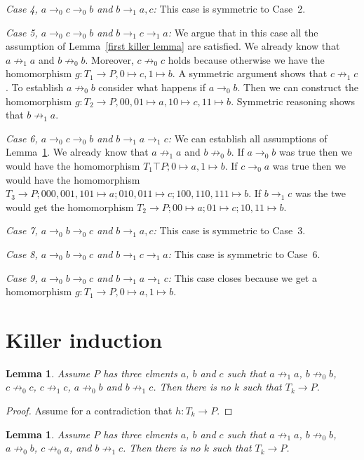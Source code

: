 \documentclass[a4paper]{article}
\newtheorem{lemma}[theorem]{Lemma}
\newcommand{\case}[2]{\vspace{1ex}\noindent\textit{Case #1, #2:}}
\begin{document}
\case{4}{$a \rightarrow_0 c \rightarrow_0 b$ and $b \rightarrow_1 a,c$}
This case is symmetric to Case~2.

\case{5}{$a \rightarrow_0 c \rightarrow_0 b$ and $b \rightarrow_1 c
\rightarrow_1 a$}
We argue that in this case all the assumption of Lemma~\ref{first killer
lemma} are satisfied. We already know that $a \not \rightarrow_1 a$ and
$b \not \rightarrow_0 b$. Moreover, $c \not \rightarrow_0 c$ holds
because otherwise we have the homomorphism $g : T_1 \to P, 0 \mapsto c,
1 \mapsto b$. A symmetric argument shows that $c \not \rightarrow_1 c$.
To establish $a \not \rightarrow_0 b$ consider what happens if $a
\rightarrow_0 b$. Then we can construct the homomorphism $g : T_2 \to P,
00, 01 \mapsto a, 10 \mapsto c, 11 \mapsto b$. Symmetric reasoning shows
that $b \not \rightarrow_1 a$.

\case{6}{$a \rightarrow_0 c \rightarrow_0 b$ and $b \rightarrow_1 a
\rightarrow_1 c$}
We can establish all assumptions of Lemma~\ref{second killer lemma}. We
already know that $a \not \rightarrow_1 a$ and $b \not \rightarrow_0 b$.
If $a \rightarrow_0 b$ was true then we would have the homomorphism $T_1
\top P; 0 \mapsto a, 1 \mapsto b$. If $c \rightarrow_0 a$ was true then
we would have the homomorphism $T_3 \to P; 000,001,101 \mapsto a;
010,011 \mapsto c; 100,110,111 \mapsto b$. If $b \rightarrow_1 c$ was
the twe would get the homomorphism $T_2 \to P; 00 \mapsto a; 01 \mapsto
c; 10,11 \mapsto b$.


\case{7}{$a \rightarrow_0 b \rightarrow_0 c$ and $b \rightarrow_1 a,c$}
This case is symmetric to Case~3.

\case{8}{$a \rightarrow_0 b \rightarrow_0 c$ and $b \rightarrow_1 c
\rightarrow_1 a$}
This case is symmetric to Case~6.

\case{9}{$a \rightarrow_0 b \rightarrow_0 c$ and $b \rightarrow_1 a
\rightarrow_1 c$} This case closes because we get a homomorphism $g :
T_1 \to P, 0 \mapsto a, 1 \mapsto b$.

\section{Killer induction}

\begin{lemma} \label{first killer lemma}
 Assume $P$ has three elments $a$, $b$ and $c$ such that $a \not
\rightarrow_1 a$, $b \not \rightarrow_0 b$, $c \not \rightarrow_0 c$,
$c \not \rightarrow_1 c$, $a \not \rightarrow_0 b$ and $b \not
\rightarrow_1 c$. Then there is no $k$ such that $T_k \to P$.
\end{lemma}
\begin{proof}
 Assume for a contradiction that $h : T_k \to P$.
\end{proof}

\begin{lemma} \label{second killer lemma}
 Assume $P$ has three elments $a$, $b$ and $c$ such that $a \not
\rightarrow_1 a$, $b \not \rightarrow_0 b$, $a \not \rightarrow_0 b$, $c
\not \rightarrow_0 a$, and $b \not \rightarrow_1 c$. Then there is no
$k$ such that $T_k \to P$.
\end{lemma}
\end{document}
